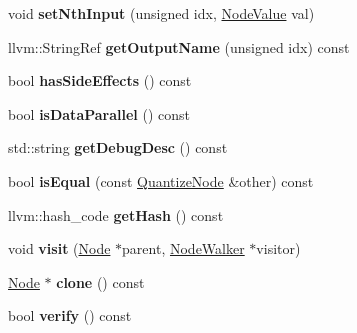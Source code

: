 \begin{DoxyCompactItemize}
\mbox{\label{classglow_1_1_quantize_node_a9b821bca9fcbc0018a239135a899c6b8}} 
void {\bfseries set\+Nth\+Input} (unsigned idx, \hyperlink{structglow_1_1_node_value}{Node\+Value} val)
\item 
\mbox{\label{classglow_1_1_quantize_node_a01b2e3031ad5eefd939a530440365d7c}} 
llvm\+::\+String\+Ref {\bfseries get\+Output\+Name} (unsigned idx) const
\item 
\mbox{\label{classglow_1_1_quantize_node_a95a1c677bb9acdef8e766d7ef31f7155}} 
bool {\bfseries has\+Side\+Effects} () const
\item 
\mbox{\label{classglow_1_1_quantize_node_ae60242a1655adf514023581a2ea6c7b0}} 
bool {\bfseries is\+Data\+Parallel} () const
\item 
\mbox{\label{classglow_1_1_quantize_node_a54fa21c05e8b96c8d28bc7801edc54a0}} 
std\+::string {\bfseries get\+Debug\+Desc} () const
\item 
\mbox{\label{classglow_1_1_quantize_node_a4e8ee7eaf30ebc2fa435a27f2401cb3b}} 
bool {\bfseries is\+Equal} (const \hyperlink{classglow_1_1_quantize_node}{Quantize\+Node} \&other) const
\item 
\mbox{\label{classglow_1_1_quantize_node_a14947b5bead8f68561cfe6529ae643d7}} 
llvm\+::hash\+\_\+code {\bfseries get\+Hash} () const
\item 
\mbox{\label{classglow_1_1_quantize_node_a238b030d1ab2137f360aa633fece94d6}} 
void {\bfseries visit} (\hyperlink{classglow_1_1_node}{Node} $\ast$parent, \hyperlink{classglow_1_1_node_walker}{Node\+Walker} $\ast$visitor)
\item 
\mbox{\label{classglow_1_1_quantize_node_aeebb70bc86b0c83a7fbea102b2a1d4ce}} 
\hyperlink{classglow_1_1_node}{Node} $\ast$ {\bfseries clone} () const
\item 
\mbox{\label{classglow_1_1_quantize_node_a98f2e884844312648cc4b87f8005b267}} 
bool {\bfseries verify} () const
\end{DoxyCompactItemize}
